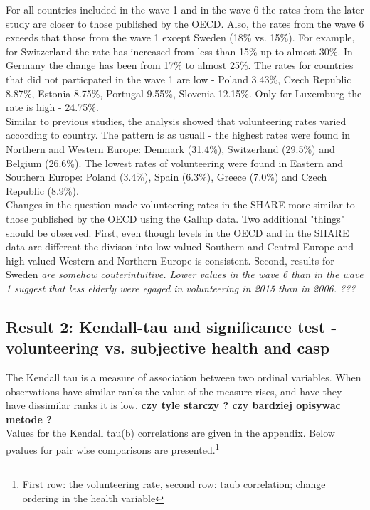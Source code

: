 \documentclass[10pt, letterpaper]{article}
\begin{document}
\begin{spacing}{1.4}
For all countries included in the wave 1 and in the wave 6 the rates from the later study are closer to those published by the OECD. Also, the rates from the wave 6 exceeds that those from the wave 1 except Sweden (18\% vs. 15\%).  For example, for Switzerland the rate has increased from less than 15\% up to almost 30\%. In Germany the change has been from 17\% to almost 25\%. The rates for countries that did not particpated in the wave 1 are low - Poland 3.43\%, Czech Republic 8.87\%, Estonia 8.75\%, Portugal 9.55\%, Slovenia 12.15\%. Only for Luxemburg the rate is high - 24.75\%. \\

Similar to previous studies, the analysis showed that volunteering rates varied according to country. The pattern is as usuall - the highest rates 
were found in Northern and Western Europe:  Denmark (31.4\%), Switzerland (29.5\%) and Belgium (26.6\%). The lowest rates of volunteering were found in Eastern and Southern Europe: Poland (3.4\%), Spain (6.3\%), Greece (7.0\%) and Czech Republic (8.9\%). \\

Changes in the question made volunteering rates in the SHARE more similar to those published by the OECD using the Gallup data. Two additional "things" should be observed. First, even though levels in the OECD and in the SHARE data are different the divison into low valued Southern and Central Europe and high valued Western and Northern Europe is consistent. Second, results for Sweden \textit{are somehow couterintuitive. Lower values in the wave 6 than in the wave 1 suggest that less elderly were egaged in volunteering in 2015 than in 2006. ??? }


\subsection{Result 2: Kendall-tau and significance test - volunteering vs. subjective health and casp}

The Kendall tau is a measure of association between two ordinal variables. When observations have similar ranks the value of the measure rises, and have they have dissimilar ranks it is low. \textbf{czy tyle starczy ? czy bardziej opisywac metode ?} \\

Values for the Kendall tau(b) correlations are given in the appendix. Below pvalues for pair wise comparisons are presented.\footnote{First row: the volunteering rate, second row: taub correlation; change ordering in the health variable } 


\end{spacing}
\end{document}
